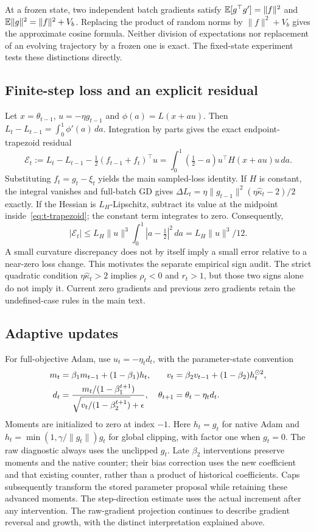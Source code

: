 At a frozen state, two independent batch gradients satisfy $\mathbb{E}[g^\top g']=\|f\|^2$ and $\mathbb{E}\|g\|^2=\|f\|^2+V_b$. Replacing the product of random norms by $\|f\|^2+V_b$ gives the approximate cosine formula. Neither division of expectations nor replacement of an evolving trajectory by a frozen one is exact. The fixed-state experiment tests these distinctions directly.

\subsection{Finite-step loss and an explicit residual}
Let $x=\theta_{t-1}$, $u=-\eta g_{t-1}$ and $\phi(a)=L(x+a u)$. Then $L_t-L_{t-1}=\int_0^1\phi'(a)\,da$. Integration by parts gives the exact endpoint-trapezoid residual
\begin{equation}
 \mathcal E_t:=L_t-L_{t-1}-\tfrac12(f_{t-1}+f_t)^\top u
 =\int_0^1(\tfrac12-a)u^\top H(x+a u)u\,da.
 \label{eq:t-trapezoid}
\end{equation}
Substituting $f_t=g_t-\xi_t$ yields the main sampled-loss identity. If $H$ is constant, the integral vanishes and full-batch GD gives $\Delta L_t=\eta\|g_{t-1}\|^2(\eta\widehat\kappa_t-2)/2$ exactly. If the Hessian is $L_H$-Lipschitz, subtract its value at the midpoint inside~\eqref{eq:t-trapezoid}; the constant term integrates to zero. Consequently,
\begin{equation}
 |\mathcal E_t|\leq L_H\|u\|^3\int_0^1|a-\tfrac12|^2\,da
 =L_H\|u\|^3/12.
\end{equation}
A small curvature discrepancy does not by itself imply a small error relative to a near-zero loss change. This motivates the separate empirical sign audit. The strict quadratic condition $\eta\widehat\kappa_t>2$ implies $\rho_t<0$ and $r_t>1$, but those two signs alone do not imply it. Current zero gradients and previous zero gradients retain the undefined-case rules in the main text.

\subsection{Adaptive updates}
For full-objective Adam, use $u_t=-\eta_t d_t$, with the parameter-state convention
\begin{align}
 m_t&=\beta_1m_{t-1}+(1-\beta_1)h_t,&
 v_t&=\beta_2v_{t-1}+(1-\beta_2)h_t^{\odot2},\notag\\
 d_t&=\frac{m_t/(1-\beta_1^{t+1})}{\sqrt{v_t/(1-\beta_2^{t+1})}+\epsilon},&
 \theta_{t+1}&=\theta_t-\eta_t d_t.
\end{align}
Moments are initialized to zero at index $-1$. Here $h_t=g_t$ for native Adam and $h_t=\min(1,\gamma/\|g_t\|)g_t$ for global clipping, with factor one when $g_t=0$. The raw diagnostic always uses the unclipped $g_t$. Late $\beta_2$ interventions preserve moments and the native counter; their bias correction uses the new coefficient and that existing counter, rather than a product of historical coefficients. Caps subsequently transform the stored parameter proposal while retaining these advanced moments. The step-direction estimate uses the actual increment after any intervention. The raw-gradient projection continues to describe gradient reversal and growth, with the distinct interpretation explained above.
